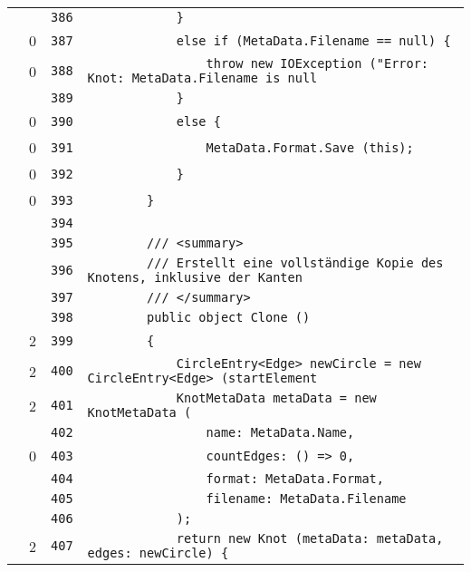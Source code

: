 \documentclass[a4paper,10pt]{article}
\begin{document}
\begin{longtable}[l]{lrrl}
\cellcolor{gray} &  & \verb~386~ & \verb~            }~\\
\cellcolor{red} & 0 & \verb~387~ & \verb~            else if (MetaData.Filename == null) {~\\
\cellcolor{red} & 0 & \verb~388~ & \verb~                throw new IOException ("Error: Knot: MetaData.Filename is null~\\
\cellcolor{gray} &  & \verb~389~ & \verb~            }~\\
\cellcolor{red} & 0 & \verb~390~ & \verb~            else {~\\
\cellcolor{red} & 0 & \verb~391~ & \verb~                MetaData.Format.Save (this);~\\
\cellcolor{red} & 0 & \verb~392~ & \verb~            }~\\
\cellcolor{red} & 0 & \verb~393~ & \verb~        }~\\
\cellcolor{gray} &  & \verb~394~ & \verb~~\\
\cellcolor{gray} &  & \verb~395~ & \verb~        /// <summary>~\\
\cellcolor{gray} &  & \verb~396~ & \verb~        /// Erstellt eine vollständige Kopie des Knotens, inklusive der Kanten~\\
\cellcolor{gray} &  & \verb~397~ & \verb~        /// </summary>~\\
\cellcolor{gray} &  & \verb~398~ & \verb~        public object Clone ()~\\
\cellcolor{green} & 2 & \verb~399~ & \verb~        {~\\
\cellcolor{green} & 2 & \verb~400~ & \verb~            CircleEntry<Edge> newCircle = new CircleEntry<Edge> (startElement ~\\
\cellcolor{green} & 2 & \verb~401~ & \verb~            KnotMetaData metaData = new KnotMetaData (~\\
\cellcolor{gray} &  & \verb~402~ & \verb~                name: MetaData.Name,~\\
\cellcolor{red} & 0 & \verb~403~ & \verb~                countEdges: () => 0,~\\
\cellcolor{gray} &  & \verb~404~ & \verb~                format: MetaData.Format,~\\
\cellcolor{gray} &  & \verb~405~ & \verb~                filename: MetaData.Filename~\\
\cellcolor{gray} &  & \verb~406~ & \verb~            );~\\
\cellcolor{green} & 2 & \verb~407~ & \verb~            return new Knot (metaData: metaData, edges: newCircle) {~\\

\end{longtable}
\end{document}
